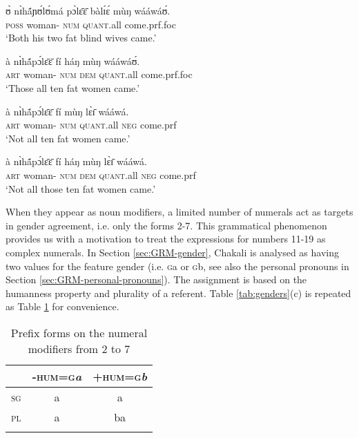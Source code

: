 \begin{exe}
\begin{exe}
\begin{exe}
\begin{exe}
\begin{exe}
\begin{exe}
\begin{exe}
\begin{exe}
\begin{exe}
\begin{exe}
\ex\label{ex:all-fat-blind-two-w}
\gll ʊ̀ nɪ̀hã́ɲʊ́lʊ́má pɔ̀lɛ̄ɛ̄  bàlɪ́ɛ́ mùŋ  wááwáʊ́.\\
\textsc{poss} {woman-\qual}  {\qual} \textsc{num} 
\textsc{quant}.all  come.{\sc prf.foc}\\
\glt `Both his two fat blind wives came.'

\ex\label{ex:all-fat-ten-w-those}
\gll  à nɪ̀hã́pɔ́lɛ̄ɛ̄ fí háŋ mùŋ wááwáʊ́.\\
\textsc{art} {woman-\qual} \textsc{num}  \textsc{dem} \textsc{quant}.all
  come.{\sc prf.foc}\\
\glt `Those all ten fat women came.'


\ex\label{ex:all-fat-ten-w-n}
\gll à nɪ̀hã́pɔ́lɛ̄ɛ̄ fí mùŋ lɛ̀ɪ̄ wááwá.\\
\textsc{art} {woman-\qual} \textsc{num} \textsc{quant}.all
\textsc{neg}  come.{\sc prf}  \\
\glt `Not all ten fat women came.'

 \ex\label{ex:full-temp}
\gll à nɪ̀hã́pɔ́lɛ̄ɛ̄ fí háŋ mùŋ  lɛ̀ɪ̄ wááwá. \\
\textsc{art} {woman-\qual}  \textsc{num}   \textsc{dem}  \textsc{quant}.all
\textsc{neg}   come.{\sc prf} \\
\glt `Not all those ten fat  women came.'

\z
\z

When they appear as noun modifiers,  a limited number of numerals act as targets in gender agreement, i.e. only the forms 2-7. This grammatical phenomenon provides us with a  motivation to treat  the expressions for numbers 11-19 as complex numerals. In Section \ref{sec:GRM-gender},  Chakali is analysed as having two values for the feature gender (i.e. \textsc{g}{\sls a} or \textsc{g}{\sls b}, see also the personal pronouns in  Section \ref{sec:GRM-personal-pronouns}). The assignment is based on the humanness property and plurality of a referent.  Table \ref{tab:genders}(c) is repeated as Table \ref{tab:distagree} for convenience. 


\begin{table}
\caption{Prefix forms on the numeral modifiers  from 2 
to 7\label{tab:distagree}}
\centering
 \begin{tabular}{lcc}
\lsptoprule
&\textsc{-hum}=\textsc{g}\textit{a}&\textsc{+hum}=\textsc{g}\textit{b}\\
\midrule
\textsc{sg}&a&a\\
\textsc{pl}&a&ba\\
\lspbottomrule
 \end{tabular} 



\end{table}
\end{exe}
\end{exe}
\end{exe}
\end{exe}
\end{exe}
\end{exe}
\end{exe}
\end{exe}
\end{exe}
\end{exe}
